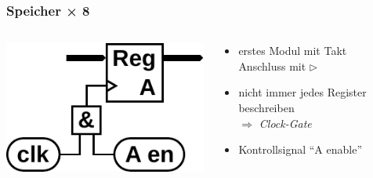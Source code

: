 \documentclass[t,aspectratio=169,usenames,dvipsnames]{beamer}
\begin{document}
\begin{frame}
  \frametitle{Speicher × 8}

  \begin{columns}[T]
    \begin{column}{.45\textwidth}
      \includegraphics[width=\linewidth]{register.pdf}
    \end{column}
    \begin{column}{.45\textwidth}
      \begin{itemize}
      \item erstes Modul mit Takt\\
        Anschluss mit {\Large$\triangleright$}
      \item nicht immer jedes Register beschreiben\\
        $\Rightarrow$ \emph{Clock-Gate}
      \item Kontrollsignal \enquote{A enable}
      \end{itemize}
    \end{column}
  \end{columns}

\end{frame}
\end{document}
